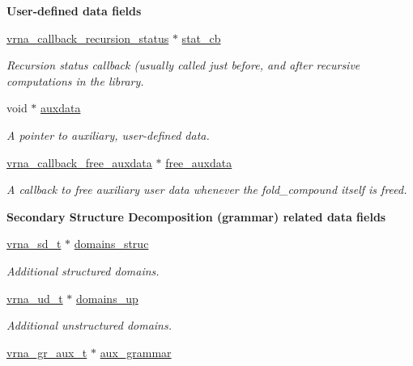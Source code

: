 \begin{Indent}\textbf{ User-\/defined data fields}\par
\begin{DoxyCompactItemize}
\item 
\mbox{\hyperlink{group__fold__compound_gac86036fa8cad1108832335063243cdc8}{vrna\+\_\+callback\+\_\+recursion\+\_\+status}} $\ast$ \mbox{\hyperlink{group__fold__compound_a87a83f6795b569000efcbe65acc3dd81}{stat\+\_\+cb}}
\begin{DoxyCompactList}\small\item\em Recursion status callback (usually called just before, and after recursive computations in the library. \end{DoxyCompactList}\item 
void $\ast$ \mbox{\hyperlink{group__fold__compound_a20048e0c369e9f24b55423d600037c68}{auxdata}}
\begin{DoxyCompactList}\small\item\em A pointer to auxiliary, user-\/defined data. \end{DoxyCompactList}\item 
\mbox{\hyperlink{group__fold__compound_ga7806651f51b195013839a218b3bbd5a3}{vrna\+\_\+callback\+\_\+free\+\_\+auxdata}} $\ast$ \mbox{\hyperlink{group__fold__compound_a8e84dbabab016ecd74da6c38cb94e816}{free\+\_\+auxdata}}
\begin{DoxyCompactList}\small\item\em A callback to free auxiliary user data whenever the fold\+\_\+compound itself is free\textquotesingle{}d. \end{DoxyCompactList}\end{DoxyCompactItemize}
\end{Indent}
\begin{Indent}\textbf{ Secondary Structure Decomposition (grammar) related data fields}\par
\begin{DoxyCompactItemize}
\item 
\mbox{\hyperlink{structured__domains_8h_afa7bbdebb6be4a0d8b829208d4083383}{vrna\+\_\+sd\+\_\+t}} $\ast$ \mbox{\hyperlink{group__fold__compound_ac25a84f2658de0d7a54cd710c16198b1}{domains\+\_\+struc}}
\begin{DoxyCompactList}\small\item\em Additional structured domains. \end{DoxyCompactList}\item 
\mbox{\hyperlink{group__domains__up_ga0009117b14d29143e8b18ab891f48c2d}{vrna\+\_\+ud\+\_\+t}} $\ast$ \mbox{\hyperlink{group__fold__compound_a4f70b6d32681fc8ca061236f21819ae7}{domains\+\_\+up}}
\begin{DoxyCompactList}\small\item\em Additional unstructured domains. \end{DoxyCompactList}\item 
\mbox{\hyperlink{group__grammar_ga8825fbe6d7de2ff61c232cc7550a82cc}{vrna\+\_\+gr\+\_\+aux\+\_\+t}} $\ast$ \mbox{\hyperlink{group__fold__compound_a42f34f531718cead0550a1ed59785e6d}{aux\+\_\+grammar}}
\end{DoxyCompactItemize}
\end{Indent}
